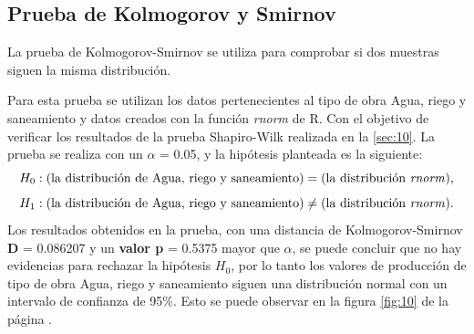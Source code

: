 \documentclass{article}
\begin{document}
\subsection{Prueba de Kolmogorov y Smirnov}
La prueba de Kolmogorov-Smirnov se utiliza para comprobar si dos muestras siguen la misma distribución.

Para esta prueba se utilizan los datos pertenecientes al tipo de obra Agua, riego y saneamiento y datos creados con la función \textit{rnorm} de R. Con el objetivo de verificar los resultados de la prueba Shapiro-Wilk realizada en la \ref{sec:10}. La prueba se realiza con un $\alpha$ = 0.05, y la hipótesis planteada es la siguiente:
\begin{equation}\label{eq:1}
H_{0}:\text{(la distribución de Agua, riego y saneamiento)} = \text{(la distribución \textit{rnorm})}, 
\end{equation}
\begin{equation}\label{eq:2}
H_{1}: \text{(la distribución de Agua, riego y saneamiento)} \neq \text{(la distribución \textit{rnorm})}. 
\end{equation}
Los resultados obtenidos en la prueba, con una distancia de Kolmogorov-Smirnov \textbf{D} = 0.086207 y un \textbf{valor p} = 0.5375 mayor que $\alpha$, se puede concluir que no hay evidencias para rechazar la hipótesis $H_{0}$, por lo tanto los valores de producción de  tipo de obra Agua, riego y saneamiento siguen una distribución normal con un intervalo de confianza de 95\%. Esto se puede observar en la figura \ref{fig:10} de la página \pageref{fig:10}.
\end{document}
